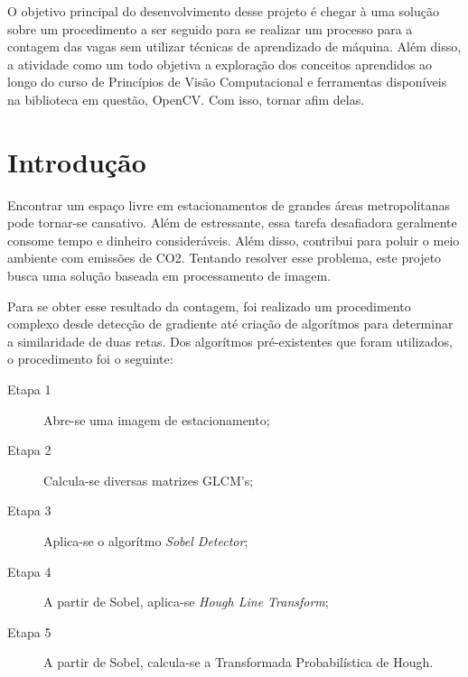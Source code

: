 \documentclass[10pt,twocolumn,letterpaper]{article}
\begin{document}
	O objetivo principal do desenvolvimento desse projeto é chegar à uma solução sobre
um procedimento a ser seguido para se realizar um processo para a contagem das vagas
sem utilizar técnicas de aprendizado de máquina. Além disso, a
atividade como um todo objetiva a exploração dos conceitos aprendidos ao longo do curso
de Princípios de Visão Computacional e ferramentas disponíveis na biblioteca em questão,
OpenCV{\footnotesize \cite{opencv}}. Com isso, tornar afim delas.





\section{Introdução}

	Encontrar um espaço livre em estacionamentos de grandes áreas metropolitanas
pode tornar-se cansativo. Além de estressante, essa tarefa desafiadora geralmente
consome tempo e dinheiro consideráveis. Além disso, contribui para poluir o meio
ambiente com emissões de CO2. Tentando resolver esse problema, este projeto busca
uma solução baseada em processamento de imagem.

	Para se obter esse resultado da contagem, foi realizado um procedimento complexo
desde detecção de gradiente até criação de algorítmos para determinar a similaridade de
duas retas. Dos algorítmos pré-existentes que foram utilizados, o procedimento foi o seguinte:


\begin{description}
\item [Etapa 1] Abre-se uma imagem de estacionamento;
\item [Etapa 2] Calcula-se diversas matrizes GLCM's;
\item [Etapa 3] Aplica-se o algorítmo {\em Sobel Detector}{\footnotesize \cite{sobel1}};
\item [Etapa 4] A partir de Sobel, aplica-se {\em Hough Line Transform};
\item [Etapa 5] A partir de Sobel, calcula-se a Transformada Probabilística de Hough.
\end{description}
\end{document}
